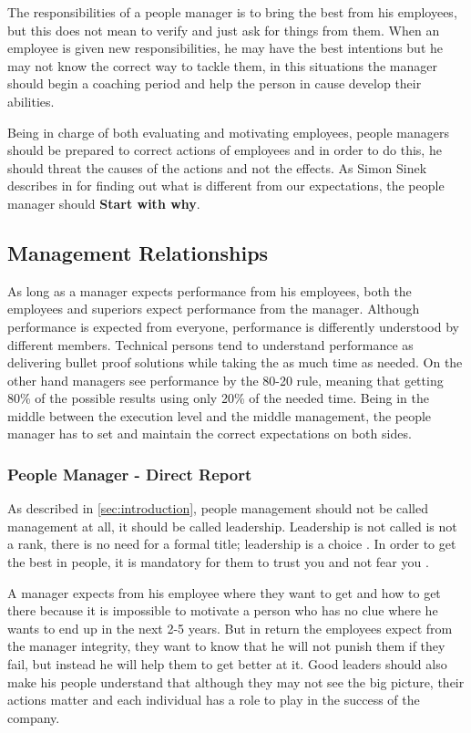 The responsibilities of a people manager is to bring the best from his employees, but this does not mean to verify and just ask for things from them. When an employee is given new responsibilities, he may have the best intentions but he may not know the correct way to tackle them, in this situations the manager should begin a coaching period and help the person in cause develop their abilities.

Being in charge of both evaluating and motivating employees, people managers should be prepared to correct actions of employees and in order to do this, he should threat the causes of the actions and not the effects. As Simon Sinek describes in \cite{why} for finding out what is different from our expectations, the people manager should \textbf{Start with why}.
\subsection{Management Relationships}
\label{subsec:relationships}
As long as a manager expects performance from his employees, both the employees and superiors expect performance from the manager. Although performance is expected from everyone, performance is differently understood by different members. Technical persons tend to understand performance as delivering bullet proof solutions while taking the as much time as needed. On the other hand managers see performance by the 80-20 rule, meaning that getting 80\% of the possible results using only 20\% of the needed time. Being in the middle between the execution level and the middle management, the people manager has to set and maintain the correct expectations on both sides.

\subsubsection{People Manager - Direct Report}
\label{sub-subsec:pmdr}
As described in \cref{sec:introduction}, people management should not be called management at all, it should be called leadership. Leadership is not called is not a rank, there is no need for a formal title; leadership is a choice \cite{safe}. In order to get the best in people, it is mandatory for them to trust you and not fear you . 

A manager expects from his employee where they want to get and how to get there because it is impossible to motivate a person who has no clue where he wants to end up in the next 2-5 years. But in return the employees expect from the manager integrity, they want to know that he will not punish them if they fail, but instead he will help them to get better at it. Good leaders should also make his people understand that although they may not see the big picture, their actions matter and each individual has a role to play in the success of the company.

